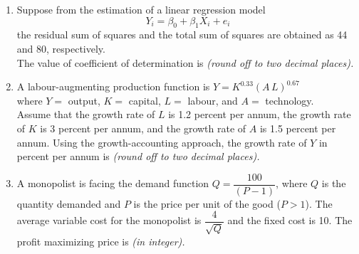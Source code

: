 \documentclass[12pt]{article}
\theoremstyle{remark}
\begin{document}
\begin{enumerate}
\hfill{}
\item  Suppose from the estimation of a linear regression model 
$$Y_i = \beta_0 + \beta_1 X_i + e_i$$
the residual sum of squares and the total sum of squares are obtained as 44 and 80, respectively. \\
The value of coefficient of determination is \underline{\hspace{2cm}} \textit{(round off to two decimal places).} 
\\

\hfill{}
\item  A labour-augmenting production function is 
\hspace{1cm} $Y = K^{0.33}(A \, L)^{0.67}$ \\
where $Y =$ output, $K =$ capital, $L =$ labour, and $A =$ technology. \\
Assume that the growth rate of $L$ is 1.2 percent per annum, the growth rate of $K$ is 3 percent per annum, and the growth rate of $A$ is 1.5 percent per annum. \newline Using the growth-accounting approach, the growth rate of $Y$ in percent per annum is \underline{\hspace{2cm}} \textit{(round off to two decimal places).} 
\\

\hfill{}
\item  A monopolist is facing the demand function $Q = \dfrac{100}{(P - 1)}$, where $Q$ is the quantity demanded and $P$ is the price per unit of the good ($P > 1$). The average variable cost for the monopolist is $\dfrac{4}{\sqrt{Q}}$ and the fixed cost is 10. The profit maximizing price is \underline{\hspace{2cm}} \textit{(in integer).} 
\end{enumerate}
\hfill{}
\end{document}
